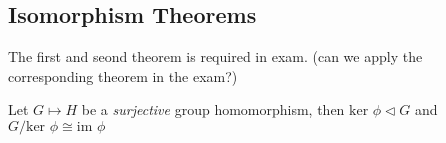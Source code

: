 \subsection{Isomorphism Theorems}
The first and seond theorem is required in exam. (can we apply the corresponding theorem in the exam?)

\begin{theorem}
Let $G\mapsto H$ be a \emph{surjective} group homomorphism, then $\mbox{ker }\phi\triangleleft G$ and $G/\mbox{ker }\phi\cong\mbox{im }\phi$
\end{theorem}

















